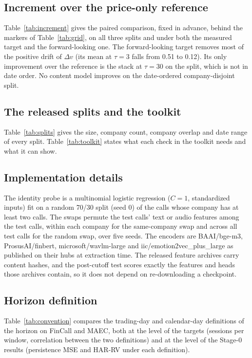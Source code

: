 



\subsection{Increment over the price-only reference}
Table~\ref{tab:increment} gives the paired comparison, fixed in advance, behind the
markers of Table~\ref{tab:grid}, on all three splits and under both the measured
target and the forward-looking one. The forward-looking target removes most of
the positive drift of $\Delta v$ (its mean at $\tau{=}3$ falls from 0.51 to 0.12).
Its only improvement over the reference is the stack at $\tau{=}30$ on the
\tickerdisjoint{} split, which is not in date order. No content model improves
on the date-ordered company-disjoint split.


\subsection{The released splits and the toolkit}
Table~\ref{tab:splits} gives the size, company count, company overlap and date
range of every split. Table~\ref{tab:toolkit} states what each check in the
toolkit needs and what it can show.



\subsection{Implementation details}
The identity probe is a multinomial logistic regression ($C{=}1$, standardized
inputs) fit on a random 70/30 split (seed 0) of the calls whose company has at
least two calls. The swaps permute the test calls' text or audio features among
the test calls, within each company for the same-company swap and across all
test calls for the random swap, over five seeds. The encoders are BAAI/bge-m3,
ProsusAI/finbert, microsoft/wavlm-large and iic/emotion2vec\_plus\_large as
published on their hubs at extraction time. The released feature archives carry
content hashes, and the post-cutoff test scores exactly the features and heads
those archives contain, so it does not depend on re-downloading a checkpoint.

\subsection{Horizon definition}
Table~\ref{tab:convention} compares the trading-day and calendar-day definitions of
the horizon on FinCall and MAEC, both at the level of the targets (sessions per
window, correlation between the two definitions) and at the level of the Stage-0
results (persistence MSE and HAR-RV \Rtwo{} under each definition).


